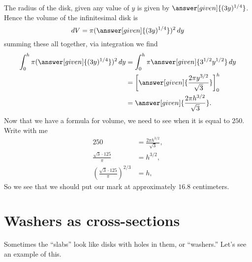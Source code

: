 \documentclass{ximera}
\begin{document}
\begin{example}
\begin{explanation}
\begin{image}
    \end{image}
    The radius of the disk, given any value of $y$ is given by
    $\answer[given]{(3y)^{1/4}}$. Hence the volume of the
    infinitesimal disk is
    \[
    \d V = \pi (\answer[given]{(3y)^{1/4}})^2 \d y
    \]
    summing these all together, via integration we find
    \begin{align*}
      \int_0^h \pi (\answer[given]{(3y)^{1/4}})^2 \d y &= \int_0^h \pi\answer[given]{3^{1/2} y^{1/2}} \d y\\
      &= \eval{\answer[given]{\frac{2\pi y^{3/2}}{\sqrt{3}}}}_0^h\\
      &= \answer[given]{\frac{2\pi h^{3/2}}{\sqrt{3}}}.
    \end{align*}
    Now that we have a formula for volume, we need to see when it is
    equal to $250$. Write with me
    \begin{align*}
      250 &= \frac{2\pi h^{3/2}}{\sqrt{3}},\\
      \frac{\sqrt{3} \cdot 125}{\pi} &=  h^{3/2},\\
      \left(\frac{\sqrt{3} \cdot 125}{\pi}\right)^{2/3} &=  h,
    \end{align*}
    So we see that we should put our mark at approximately $16.8$
    centimeters.
  \end{explanation}
\end{example}

\section{Washers as cross-sections}


Sometimes the ``slabs'' look like disks with holes in them, or
``washers.'' Let's see an example of this.
\end{document}
